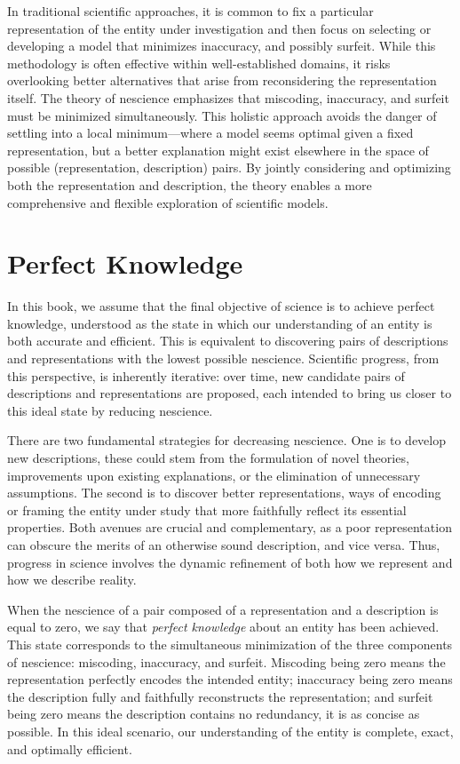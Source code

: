 In traditional scientific approaches, it is common to fix a particular representation of the entity under investigation and then focus on selecting or developing a model that minimizes inaccuracy, and possibly surfeit. While this methodology is often effective within well-established domains, it risks overlooking better alternatives that arise from reconsidering the representation itself. The theory of nescience emphasizes that miscoding, inaccuracy, and surfeit must be minimized simultaneously. This holistic approach avoids the danger of settling into a local minimum—where a model seems optimal given a fixed representation, but a better explanation might exist elsewhere in the space of possible (representation, description) pairs. By jointly considering and optimizing both the representation and description, the theory enables a more comprehensive and flexible exploration of scientific models.

%
%

\section{Perfect Knowledge}

In this book, we assume that the final objective of science is to achieve perfect knowledge, understood as the state in which our understanding of an entity is both accurate and efficient. This is equivalent to discovering pairs of descriptions and representations with the lowest possible nescience. Scientific progress, from this perspective, is inherently iterative: over time, new candidate pairs of descriptions and representations are proposed, each intended to bring us closer to this ideal state by reducing nescience.

There are two fundamental strategies for decreasing nescience. One is to develop new descriptions, these could stem from the formulation of novel theories, improvements upon existing explanations, or the elimination of unnecessary assumptions. The second is to discover better representations, ways of encoding or framing the entity under study that more faithfully reflect its essential properties. Both avenues are crucial and complementary, as a poor representation can obscure the merits of an otherwise sound description, and vice versa. Thus, progress in science involves the dynamic refinement of both how we represent and how we describe reality.

When the nescience of a pair composed of a representation and a description is equal to zero, we say that \emph{perfect knowledge} about an entity has been achieved. This state corresponds to the simultaneous minimization of the three components of nescience: miscoding, inaccuracy, and surfeit. Miscoding being zero means the representation perfectly encodes the intended entity; inaccuracy being zero means the description fully and faithfully reconstructs the representation; and surfeit being zero means the description contains no redundancy, it is as concise as possible. In this ideal scenario, our understanding of the entity is complete, exact, and optimally efficient.

